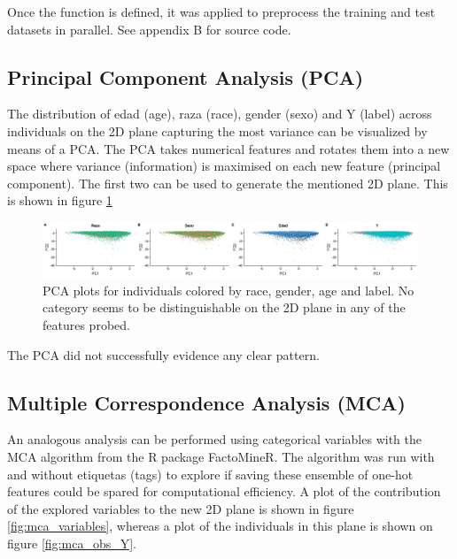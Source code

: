 \documentclass{article}\usepackage[]{graphicx}\usepackage[]{color}
\begin{document}
Once the function is defined, it was applied to preprocess the training and test datasets in parallel. See appendix B for source code.

  
\subsection{\textbf{P}rincipal \textbf{C}omponent \textbf{A}nalysis (PCA)}

The distribution of edad (age), raza (race), gender (sexo) and Y (label) across individuals on the 2D plane capturing the most variance can be visualized by means of a PCA. The PCA takes numerical features and rotates them into a new space where variance (information) is maximised on each new feature (principal component). The first two can be used to generate the mentioned 2D plane. This is shown in figure \ref{fig:pca_multicategory}

\begin{figure}[!h]
\centering
\includegraphics[width=\textwidth]{plots/PCA_multicategory}
\caption{PCA plots for individuals colored by race, gender, age and label. No category seems to be distinguishable on the 2D plane in any of the features probed.}
\label{fig:pca_multicategory}
\end{figure}

The PCA did not successfully evidence any clear pattern.

\subsection{\textbf{M}ultiple \textbf{C}orrespondence \textbf{A}nalysis (MCA)}

An analogous analysis can be performed using categorical variables with the MCA algorithm from the R package FactoMineR. The algorithm was run with and without etiquetas (tags) to explore if saving these ensemble of one-hot features could be spared for computational efficiency. A plot of the contribution of the explored variables to the new 2D plane is shown in figure \ref{fig:mca_variables}, whereas a plot of the individuals in this plane is shown on figure \ref{fig:mca_obs_Y}.
\end{document}
